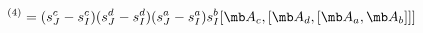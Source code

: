 \begin{equation}
[L_2^3L_1]^{(4)}=(s_{J}^{c}-s_{I}^{c})(s_{J}^{d}-s_{I}^{d}) (s_J^a-s_I^a)s_I^b [{\mb A}_c,[{\mb A}_d,[{\mb A}_a,{\mb A}_b]]]
\end{equation}

